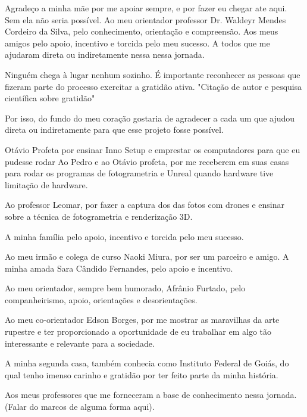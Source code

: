 


Agradeço a minha mãe por me apoiar sempre, e por fazer eu chegar ate aqui. Sem ela não seria possível.
Ao meu orientador professor Dr. Waldeyr Mendes Cordeiro da Silva, pelo conhecimento, orientação e compreensão.
Aos meus amigos pelo apoio, incentivo e torcida pelo meu sucesso.
A todos que me ajudaram direta ou indiretamente nessa nessa jornada. 


Ninguém chega à lugar nenhum sozinho.
É importante reconhecer as pessoas que fizeram parte do processo
exercitar a gratidão ativa. "Citação de autor e pesquisa científica sobre gratidão"

Por isso, do fundo do meu coração gostaria de agradecer a cada um que ajudou direta ou indiretamente para que esse projeto fosse possível. 

Otávio Profeta por ensinar Inno Setup e emprestar os computadores para que eu pudesse rodar 
Ao Pedro e ao Otávio profeta, por me receberem em suas casas para rodar os programas de fotogrametria e Unreal quando hardware tive limitação de hardware.

Ao professor Leomar, por fazer a captura dos das fotos com drones e ensinar sobre a técnica de fotogrametria e renderização 3D.

A minha família pelo apoio, incentivo e torcida pelo meu sucesso.

Ao meu irmão e colega de curso Naoki Miura, por ser um parceiro e amigo.
A minha amada Sara Cândido Fernandes, pelo apoio e incentivo.

Ao meu orientador, sempre bem humorado, Afrânio Furtado, pelo companheirismo, apoio,  orientações e desorientações.

Ao meu co-orientador Edson Borges, por me mostrar as maravilhas da arte rupestre e ter proporcionado a oportunidade de eu trabalhar em algo tão interessante e relevante para a sociedade.

A minha segunda casa, também conhecia como Instituto Federal de Goiás, do qual tenho imenso carinho e gratidão por ter feito parte da minha história.

Aos meus professores que me forneceram a base de conhecimento nessa jornada. (Falar do marcos de alguma forma aqui).

